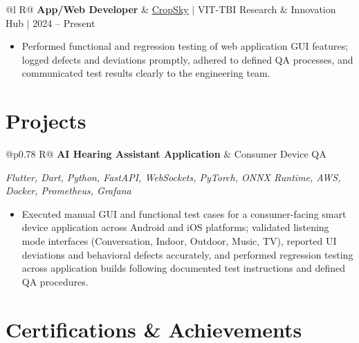 \documentclass[a4paper,10pt]{article}
\newcommand{\ulink}[2]{\href{#1}{\uline{#2}}}
\newcommand{\subheading}[1]{{\color[HTML]{0A0A0A}\fontsize{12}{14}\selectfont\bfseries #1}}
\newcommand{\techstack}[1]{{\color[HTML]{5C5C5C}\fontsize{10.5}{12.5}\selectfont\itshape #1}}
\newcommand{\meta}[1]{{\color[HTML]{5C5C5C}\fontsize{10.5}{12.5}\selectfont #1}}
\begin{document}
\vspace{2pt}

\begin{tabularx}{\linewidth}{@{}l R@{}}
\subheading{App/Web Developer} & \meta{\ulink{https://sites.google.com/view/cropsky/home}{CropSky} $|$ VIT-TBI Research \& Innovation Hub $|$ 2024 -- Present}
\end{tabularx}
\begin{itemize}[nosep, leftmargin=1.5em, itemsep=1pt, topsep=2pt]
  \item {\color[HTML]{0A0A0A}\fontsize{11}{14}\selectfont Performed functional and regression testing of web application GUI features; logged defects and deviations promptly, adhered to defined QA processes, and communicated test results clearly to the engineering team.}
\end{itemize}

\vspace{2pt}

\section{Projects}
\vspace{2pt}

\begin{tabularx}{\linewidth}{@{}p{0.78\linewidth} R@{}}
\subheading{AI Hearing Assistant Application} & \meta{Consumer Device QA}
\end{tabularx}
\vspace{1pt}
\techstack{Flutter, Dart, Python, FastAPI, WebSockets, PyTorch, ONNX Runtime, AWS, Docker, Prometheus, Grafana}
\begin{itemize}[nosep, leftmargin=1.5em, itemsep=1pt, topsep=2pt]
  \item {\color[HTML]{0A0A0A}\fontsize{11}{14}\selectfont Executed manual GUI and functional test cases for a consumer-facing smart device application across Android and iOS platforms; validated listening mode interfaces (Conversation, Indoor, Outdoor, Music, TV), reported UI deviations and behavioral defects accurately, and performed regression testing across application builds following documented test instructions and defined QA procedures.}
\end{itemize}

\vspace{2pt}

\section{Certifications \& Achievements}
\vspace{2pt}
\end{document}
